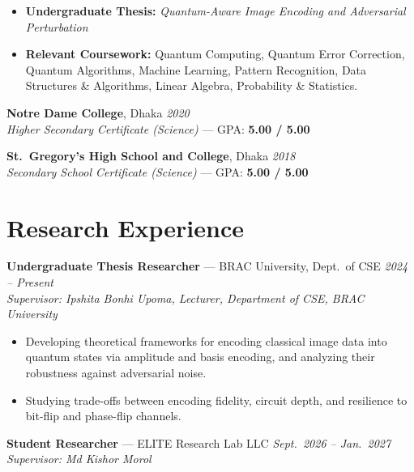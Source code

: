 \documentclass[a4paper,10pt]{article}
\begin{document}
\begin{itemize}
    \item \textbf{Undergraduate Thesis:}
    \textit{Quantum-Aware Image Encoding and Adversarial Perturbation}

    \item \textbf{Relevant Coursework:}
    Quantum Computing, Quantum Error Correction, Quantum Algorithms, Machine Learning,
    Pattern Recognition, Data Structures \& Algorithms, Linear Algebra, Probability \& Statistics.
\end{itemize}

\vspace{2pt}
\textbf{Notre Dame College}, Dhaka
\hfill
\textit{2020}
\\
\textit{Higher Secondary Certificate (Science)} --- GPA: \textbf{5.00 / 5.00}

\vspace{2pt}
\textbf{St.\ Gregory's High School and College}, Dhaka
\hfill
\textit{2018}
\\
\textit{Secondary School Certificate (Science)} --- GPA: \textbf{5.00 / 5.00}

\section*{Research Experience}

\textbf{Undergraduate Thesis Researcher} --- BRAC University, Dept.\ of CSE
\hfill
\textit{2024 -- Present}
\\
\textit{Supervisor: Ipshita Bonhi Upoma, Lecturer, Department of CSE, BRAC University}

\begin{itemize}
    \item Developing theoretical frameworks for encoding classical image data into quantum states via amplitude and basis encoding, and analyzing their robustness against adversarial noise.

    \item Studying trade-offs between encoding fidelity, circuit depth, and resilience to bit-flip and phase-flip channels.
\end{itemize}

\vspace{2pt}
\textbf{Student Researcher} --- ELITE Research Lab LLC
\hfill
\textit{Sept.\ 2026 -- Jan.\ 2027}
\\
\textit{Supervisor: Md Kishor Morol}
\end{document}
